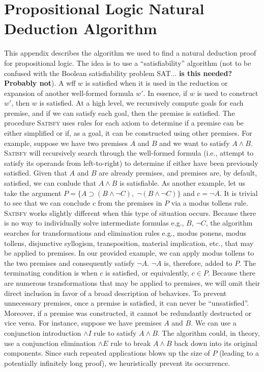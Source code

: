 \documentclass[ms]{uncgdissertationexp2}
\theoremstyle{plain}
\theoremstyle{definition}
\theoremstyle{remark}
\begin{document}
\chapter{Propositional Logic Natural Deduction Algorithm}

This appendix describes the algorithm we used to find a natural deduction proof for propositional logic. The idea is to use a ``satisfiability'' algorithm (not to be confused with the Boolean satisfiability problem SAT... \textbf{is this needed? Probably not}). A wff $w$ is satisfied when it is used in the reduction or expansion of another well-formed formula $w'$. In essence, if $w$ is used to construct $w'$, then $w$ is satisfied. At a high level, we recursively compute goals for each premise, and if we can satisfy each goal, then the premise is satisfied. The procedure \textsc{Satisfy} uses rules for each axiom to determine if a premise can be either simplified or if, as a goal, it can be constructed using other premises. For example, suppose we have two premises $A$ and $B$ and we want to satisfy $A \land B$. \textsc{Satisfy} will recursively search through the well-formed formula (i.e., attempt to satisfy its operands from left-to-right) to determine if either have been previously satisfied. Given that $A$ and $B$ are already premises, and premises are, by default, satisfied, we can conlude that $A \land B$ is satisfiable. As another example, let us take the argument $P = \{A \supset (B \land \lnot C),\;\lnot (B \land \lnot C)\}$ and $c = \lnot A$. It is trivial to see that we can conclude $c$ from the premises in $P$ via a modus tollens rule. \textsc{Satisfy} works slightly different when this type of situation occurs. Because there is no way to individually solve intermediate formulas e.g., $B$, $\lnot C$, the algorithm searches for transformations and elimination rules e.g., modus ponens, modus tollens, disjunctive syllogism, transposition, material implication, etc., that may be applied to premises. In our provided example, we can apply modus tollens to the two premises and consequently satisfy $\lnot{A}$. $\lnot{A}$ is, therefore, added to $P$. The terminating condition is when $c$ is satisfied, or equivalently, $c \in P$. Because there are numerous transformations that may be applied to premises, we will omit their direct inclusion in favor of a broad description of behaviors. To prevent unnecessary premises, once a premise is satisfied, it can never be ``unsatisfied''. Moreover, if a premise was constructed, it cannot be redundantly destructed or vice versa. For instance, suppose we have premises $A$ and $B$. We can use a conjunction introduction $\land{I}$ rule to satisfy $A \land B$. The algorithm could, in theory, use a conjunction elimination $\land{E}$ rule to break $A \land B$ back down into its original components. Since such repeated applications blows up the size of $P$ (leading to a potentially infinitely long proof), we heuristically prevent its occurrence.
\end{document}
